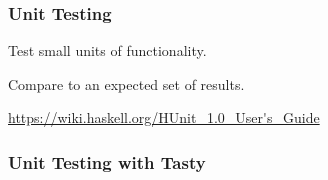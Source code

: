 \begin{frame}[fragile]

\frametitle{Unit Testing}

\vspace{\fill}

\begin{center}

Test small units of functionality.

\bigskip

Compare to an expected set of results.

\bigskip

\url{https://wiki.haskell.org/HUnit_1.0_User's_Guide}

\end{center}

\vspace{\fill}

\end{frame}


\begin{frame}

\frametitle{Unit Testing with Tasty}



\end{frame}
